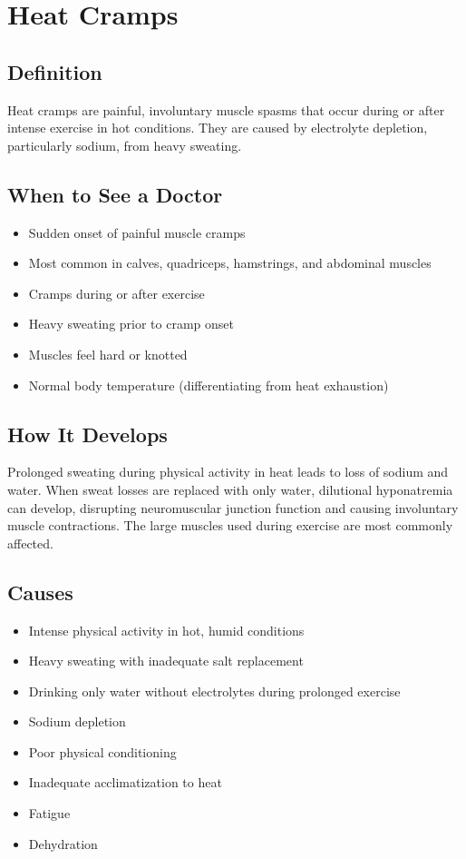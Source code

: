 \chapter{Heat Cramps}

\section*{Definition}
Heat cramps are painful, involuntary muscle spasms that occur during or after intense exercise in hot conditions. They are caused by electrolyte depletion, particularly sodium, from heavy sweating.

\section*{When to See a Doctor}
\begin{itemize}
\item Sudden onset of painful muscle cramps
\item Most common in calves, quadriceps, hamstrings, and abdominal muscles
\item Cramps during or after exercise
\item Heavy sweating prior to cramp onset
\item Muscles feel hard or knotted
\item Normal body temperature (differentiating from heat exhaustion)
\end{itemize}

\section*{How It Develops}
Prolonged sweating during physical activity in heat leads to loss of sodium and water. When sweat losses are replaced with only water, dilutional hyponatremia can develop, disrupting neuromuscular junction function and causing involuntary muscle contractions. The large muscles used during exercise are most commonly affected.

\section*{Causes}
\begin{itemize}
\item Intense physical activity in hot, humid conditions
\item Heavy sweating with inadequate salt replacement
\item Drinking only water without electrolytes during prolonged exercise
\item Sodium depletion
\item Poor physical conditioning
\item Inadequate acclimatization to heat
\item Fatigue
\item Dehydration
\end{itemize}

